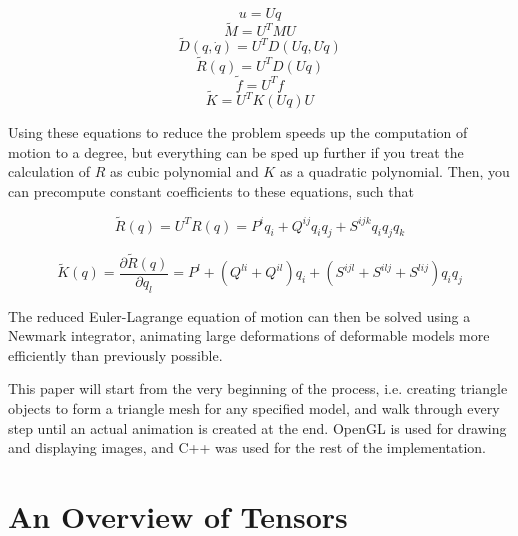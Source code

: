 \documentclass[twocolumn,10pt]{asme2ej}
\begin{document}
\begin{equation}
u = Uq
\label{eq_basisreduction}
\end{equation}
\begin{equation}
\tilde{M} = U^{T}MU
\label{eq_rmass}
\end{equation}
\begin{equation}
\tilde{D}(q, \dot q) = U^{T}D(Uq, U \dot q)
\label{eq_rdamp}
\end{equation}
\begin{equation}
\tilde{R}(q) = U^{T}D(Uq)
\label{eq_rinternal}
\end{equation}
\begin{equation}
\tilde{f} = U^{T}f
\label{eq_rexternal}
\end{equation}
\begin{equation}
\tilde{K} = U^{T}K(Uq)U
\label{eq_rstiffness}
\end{equation}

Using these equations to reduce the problem speeds up the computation of motion to a degree, but everything can be
sped up further if you treat the calculation of $R$ as cubic polynomial and $K$ as a quadratic polynomial. Then,
you can precompute constant coefficients to these equations, such that

\begin{equation}
\tilde{R}(q) = U^{T}R(q) = P^{i}q_{i} + Q^{ij}q_{i}q_{j} + S^{ijk}q_{i}q_{j}q_{k}
\label{eq_rcubicpoly}
\end{equation}

\begin{equation}
\tilde{K}(q) = \frac{\partial \tilde{R}(q)}{\partial q_{l}} = P^{l} + (Q^{li} + Q^{il})q_{i} + (S^{ijl} + S^{ilj} + S^{lij} )q_{i}q_{j}
\label{eq_rquadpoly}
\end{equation}

The reduced Euler-Lagrange equation of motion can then be solved using a Newmark integrator, animating large deformations
of deformable models more efficiently than previously possible.

This paper will start from the very beginning of the process, i.e. creating triangle objects to form a triangle mesh for any
specified model, and walk through every step until an actual animation is created at the end. OpenGL is used for drawing and displaying images, and C++ was used for the rest of the implementation.

\section{An Overview of Tensors}
\end{document}

